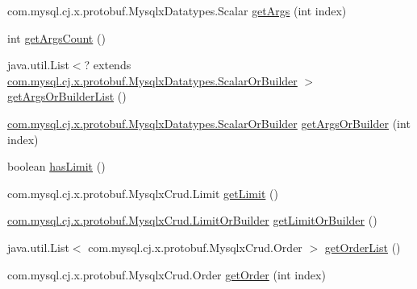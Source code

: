 \begin{DoxyCompactItemize}
\item 
com.\+mysql.\+cj.\+x.\+protobuf.\+Mysqlx\+Datatypes.\+Scalar \mbox{\hyperlink{interfacecom_1_1mysql_1_1cj_1_1x_1_1protobuf_1_1_mysqlx_crud_1_1_update_or_builder_a5dc981556feed63243a9830efc0566cb}{get\+Args}} (int index)
\item 
int \mbox{\hyperlink{interfacecom_1_1mysql_1_1cj_1_1x_1_1protobuf_1_1_mysqlx_crud_1_1_update_or_builder_a94b15c83443a0a9329f2d36c72c3cf5e}{get\+Args\+Count}} ()
\item 
java.\+util.\+List$<$? extends \mbox{\hyperlink{interfacecom_1_1mysql_1_1cj_1_1x_1_1protobuf_1_1_mysqlx_datatypes_1_1_scalar_or_builder}{com.\+mysql.\+cj.\+x.\+protobuf.\+Mysqlx\+Datatypes.\+Scalar\+Or\+Builder}} $>$ \mbox{\hyperlink{interfacecom_1_1mysql_1_1cj_1_1x_1_1protobuf_1_1_mysqlx_crud_1_1_update_or_builder_a411e5746941c3e41fc4093a3faa99721}{get\+Args\+Or\+Builder\+List}} ()
\item 
\mbox{\hyperlink{interfacecom_1_1mysql_1_1cj_1_1x_1_1protobuf_1_1_mysqlx_datatypes_1_1_scalar_or_builder}{com.\+mysql.\+cj.\+x.\+protobuf.\+Mysqlx\+Datatypes.\+Scalar\+Or\+Builder}} \mbox{\hyperlink{interfacecom_1_1mysql_1_1cj_1_1x_1_1protobuf_1_1_mysqlx_crud_1_1_update_or_builder_a6d8164598045802c5050fa2f170732e1}{get\+Args\+Or\+Builder}} (int index)
\item 
boolean \mbox{\hyperlink{interfacecom_1_1mysql_1_1cj_1_1x_1_1protobuf_1_1_mysqlx_crud_1_1_update_or_builder_acdc185b89f13b9925d0c43b9533be669}{has\+Limit}} ()
\item 
com.\+mysql.\+cj.\+x.\+protobuf.\+Mysqlx\+Crud.\+Limit \mbox{\hyperlink{interfacecom_1_1mysql_1_1cj_1_1x_1_1protobuf_1_1_mysqlx_crud_1_1_update_or_builder_a3669620d760cbc778b2fba6d738cc10c}{get\+Limit}} ()
\item 
\mbox{\hyperlink{interfacecom_1_1mysql_1_1cj_1_1x_1_1protobuf_1_1_mysqlx_crud_1_1_limit_or_builder}{com.\+mysql.\+cj.\+x.\+protobuf.\+Mysqlx\+Crud.\+Limit\+Or\+Builder}} \mbox{\hyperlink{interfacecom_1_1mysql_1_1cj_1_1x_1_1protobuf_1_1_mysqlx_crud_1_1_update_or_builder_ae9362c656bb78356dd89ae33e75b439a}{get\+Limit\+Or\+Builder}} ()
\item 
java.\+util.\+List$<$ com.\+mysql.\+cj.\+x.\+protobuf.\+Mysqlx\+Crud.\+Order $>$ \mbox{\hyperlink{interfacecom_1_1mysql_1_1cj_1_1x_1_1protobuf_1_1_mysqlx_crud_1_1_update_or_builder_adc7966b30dd2657b3986a0ee00236a79}{get\+Order\+List}} ()
\item 
com.\+mysql.\+cj.\+x.\+protobuf.\+Mysqlx\+Crud.\+Order \mbox{\hyperlink{interfacecom_1_1mysql_1_1cj_1_1x_1_1protobuf_1_1_mysqlx_crud_1_1_update_or_builder_a537e9cc374d3e815e3ca565f3079ff82}{get\+Order}} (int index)

\end{DoxyCompactItemize}
